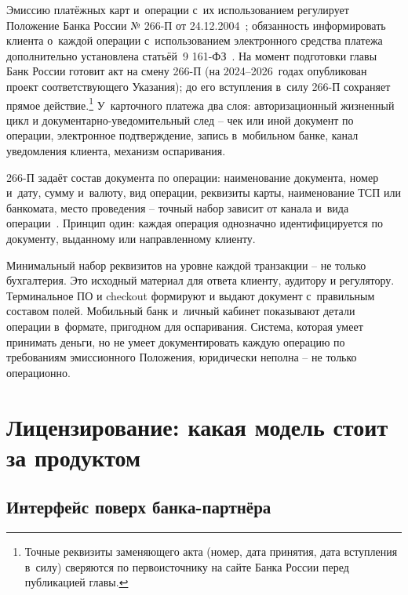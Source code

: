 Эмиссию платёжных карт и~операции с~их использованием регулирует Положение Банка России № 266-П от 24.12.2004~\cite{cbr-266p}; обязанность информировать клиента о~каждой операции с~использованием электронного средства платежа дополнительно установлена статьёй~9 161-ФЗ~\cite{fz-161}.
На момент подготовки главы Банк России готовит акт на смену 266-П (на 2024--2026~годах опубликован проект соответствующего Указания); до его вступления в~силу 266-П сохраняет прямое действие.\footnote{Точные реквизиты заменяющего акта (номер, дата принятия, дата вступления в~силу) сверяются по первоисточнику на сайте Банка России перед публикацией главы.}
У~карточного платежа два слоя: авторизационный жизненный цикл и документарно-уведомительный след -- чек или иной документ по операции, электронное подтверждение, запись в~мобильном банке, канал уведомления клиента, механизм оспаривания.

266-П задаёт состав документа по операции: наименование документа, номер и~дату, сумму и~валюту, вид операции, реквизиты карты, наименование ТСП или банкомата, место проведения -- точный набор зависит от канала и~вида операции~\cite{cbr-266p}.
Принцип один: каждая операция однозначно идентифицируется по документу, выданному или направленному клиенту.

Минимальный набор реквизитов на уровне каждой транзакции -- не только бухгалтерия. Это исходный материал для ответа клиенту, аудитору и регулятору. Терминальное ПО и checkout формируют и выдают документ с~правильным составом полей. Мобильный банк и~личный кабинет показывают детали операции в~формате, пригодном для оспаривания.
Система, которая умеет принимать деньги, но не умеет документировать каждую операцию по требованиям эмиссионного Положения, юридически неполна -- не только операционно.

\section{Лицензирование: какая модель стоит за продуктом}\label{sec:regulation-licensing}

\subsection*{Интерфейс поверх банка-партнёра}

